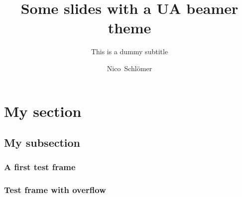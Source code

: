 \documentclass[pdflatex,compress]{beamer}
\title{Some slides with a UA beamer theme}
\subtitle{This is a dummy subtitle}
\author{Nico~Schl\"omer}
\begin{document}
\maketitle

\section{My section}
\subsection{My subsection}

\begin{frame}
\frametitle{A first test frame}
\lipsum[1]
\end{frame}

\begin{frame}
\frametitle{Test frame with overflow}
\lipsum
\end{frame}


\end{document}
